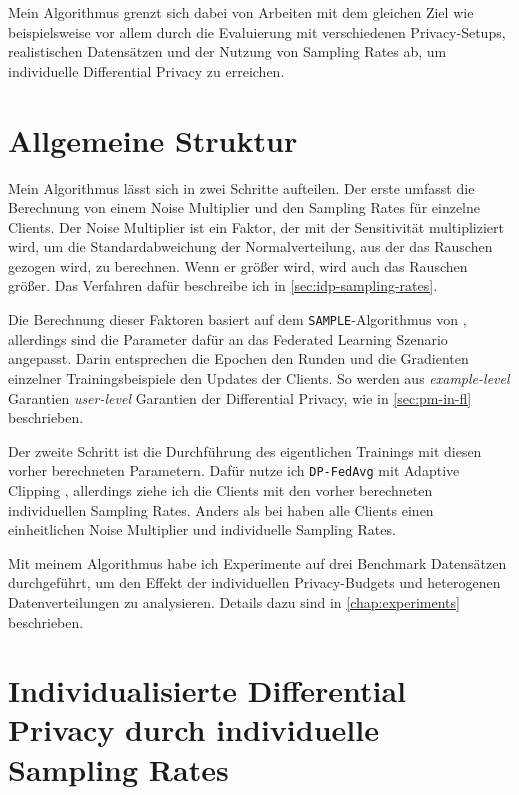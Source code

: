 Mein Algorithmus grenzt sich dabei von Arbeiten mit dem gleichen Ziel wie beispielsweise \textcite{aldaghri:2023} vor allem durch die Evaluierung mit verschiedenen Privacy-Setups, realistischen Datensätzen und der Nutzung von Sampling Rates ab, um individuelle Differential Privacy zu erreichen.

\section{Allgemeine Struktur}
Mein Algorithmus lässt sich in zwei Schritte aufteilen. Der erste umfasst die Berechnung von einem Noise Multiplier und den Sampling Rates für einzelne Clients. Der Noise Multiplier ist ein Faktor, der mit der Sensitivität multipliziert wird, um die Standardabweichung der Normalverteilung, aus der das Rauschen gezogen wird, zu berechnen. Wenn er größer wird, wird auch das Rauschen größer. Das Verfahren dafür beschreibe ich in \autoref{sec:idp-sampling-rates}. 

Die Berechnung dieser Faktoren basiert auf dem \texttt{SAMPLE}-Algorithmus von \textcite{boenisch:2023}, allerdings sind die Parameter dafür an das Federated Learning Szenario angepasst. Darin entsprechen die Epochen den Runden und die Gradienten einzelner Trainingsbeispiele den Updates der Clients. So werden aus \textit{example-level} Garantien \textit{user-level} Garantien der Differential Privacy, wie in \autoref{sec:pm-in-fl} beschrieben.

Der zweite Schritt ist die Durchführung des eigentlichen Trainings mit diesen vorher berechneten Parametern. Dafür nutze ich \texttt{DP-FedAvg} mit Adaptive Clipping \cite{andrew:2021}, allerdings ziehe ich die Clients mit den vorher berechneten individuellen Sampling Rates. Anders als bei \citeauthor{aldaghri:2023} haben alle Clients einen einheitlichen Noise Multiplier und individuelle Sampling Rates.

Mit meinem Algorithmus habe ich Experimente auf drei Benchmark Datensätzen durchgeführt, um den Effekt der individuellen Privacy-Budgets und heterogenen Datenverteilungen zu analysieren. Details dazu sind in \autoref{chap:experiments} beschrieben.

\section{Individualisierte Differential Privacy durch individuelle Sampling Rates}\label{sec:idp-sampling-rates}

